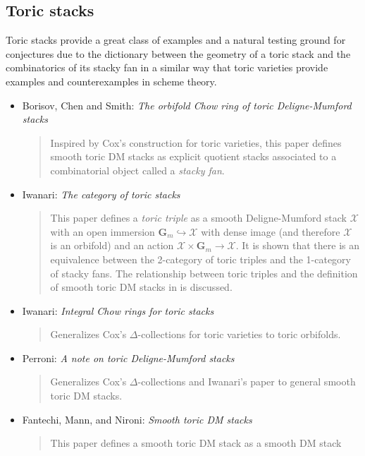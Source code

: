\subsection{Toric stacks}
\label{subsection-toric}

\noindent
Toric stacks provide a great class of examples and a natural testing ground
for conjectures due to the dictionary between the geometry of a toric stack
and the combinatorics of its stacky fan in a similar way that toric varieties
provide examples and counterexamples in scheme theory.
\begin{itemize}
\item Borisov, Chen and Smith: \emph{The orbifold Chow ring of toric
Deligne-Mumford stacks} \cite{bcs}
\begin{quote}
Inspired by Cox's construction for toric varieties, this paper defines
smooth toric DM stacks as explicit quotient stacks associated to a
combinatorial object called a \emph{stacky fan}.
\end{quote}
\item Iwanari: \emph{The category of toric stacks} \cite{iwanari_toric}
\begin{quote}
This paper defines a \emph{toric triple} as a smooth Deligne-Mumford stack
$\mathcal{X}$ with an open immersion $\mathbf{G}_m \hookrightarrow \mathcal{X}$
with dense image (and therefore $\mathcal{X}$ is an orbifold) and an action
$\mathcal{X} \times \mathbf{G}_m \rightarrow \mathcal{X}$. It is shown that
there is an equivalence between the 2-category of toric triples and the
1-category of stacky fans. The relationship between toric triples and the
definition of smooth toric DM stacks in \cite{bcs} is discussed.
\end{quote}
\item Iwanari: \emph{Integral Chow rings for toric stacks}
\cite{iwanari_chow}
\begin{quote}
Generalizes Cox's $\Delta$-collections for toric varieties to toric orbifolds.
\end{quote}
\item Perroni: \emph{A note on toric Deligne-Mumford stacks}
\cite{perroni}
\begin{quote}
Generalizes Cox's $\Delta$-collections and Iwanari's paper
\cite{iwanari_chow} to general smooth toric DM stacks.
\end{quote}
\item Fantechi, Mann, and Nironi: \emph{Smooth toric DM stacks}
\cite{fmn}
\begin{quote}
This paper defines a smooth toric DM stack as a smooth DM stack

\end{quote}
\end{itemize}
